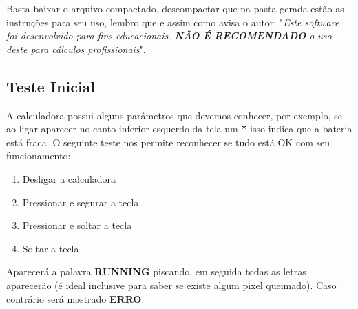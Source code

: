 Basta baixar o arquivo compactado, descompactar que na pasta gerada estão as instruções para seu uso, lembro que e assim como avisa o autor: "\textit{Este software foi desenvolvido para fins educacionais. \textbf{NÃO É RECOMENDADO} o uso deste para cálculos profissionais}".

\subsection*{Teste Inicial}
A calculadora possui alguns parâmetros que devemos conhecer, por exemplo, se ao ligar  aparecer no canto inferior esquerdo da tela um \textbf{*} isso indica que a bateria está fraca. O seguinte teste nos permite reconhecer se tudo está OK com seu funcionamento: \vspace{-1em}
\begin{enumerate}
	\item Desligar a calculadora
	\item Pressionar e segurar a tecla \keystroke{$\times$}
	\item Pressionar e soltar a tecla 
	\item Soltar a tecla \keystroke{$\times$}
\end{enumerate}

Aparecerá a palavra \textbf{RUNNING} piscando, em seguida todas as letras aparecerão (é ideal inclusive para saber se existe algum pixel queimado). Caso contrário será mostrado \textbf{ERRO}.

